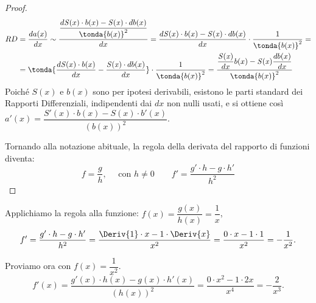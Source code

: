 \begin{proof}
\begin{align*}
 RD  &=\dfrac{da(x)}{dx}\sim  \dfrac{\dfrac{d\mathit{S}(x) \cdot b(x) - 
\mathit{S(x)} \cdot db(x)}{\tonda{b(x)}^2}}{dx}=
\dfrac{d\mathit{S}(x) \cdot b(x) - \mathit{S(x)} \cdot 
 db(x)}{dx}\cdot\dfrac{1}{\tonda{b(x)}^2}=\\
&=\tonda{\dfrac{d\mathit{S}(x) \cdot b(x)}{dx}-
  \frac{\mathit{S(x)} \cdot  db(x)}{dx} }\cdot\dfrac{1}{\tonda{b(x)}^2}= 
\dfrac{\dfrac{\mathit{S(x)}}{dx}b(x)-
\mathit{S(x)}\dfrac{db(x)}{dx}}{\tonda{b(x)}^2}
\end{align*}
Poiché \(\mathit{S(x)}\) e \(b(x)\) sono per ipotesi derivabili, esistono le 
parti standard dei Rapporti Differenziali, indipendenti dai \(dx\) non nulli 
usati, e si ottiene così 
\(a'(x)=\dfrac{\mathit{S'(x)}\cdot b(x)-
      \mathit{S(x)} \cdot b'(x)}{(b(x))^2}\).

Tornando alla notazione abituale, la regola della derivata del rapporto di 
funzioni diventa:
\[f = \dfrac{g}{h},\quad\text{ con } h \ne 0 \qquad
 f' = \dfrac{g' \cdot h - g \cdot h'}{h^2}\]
\end{proof}
\begin{esempio}
 Applichiamo la regola alla funzione: 
\(f(x) = \dfrac{g(x)}{h(x)} = \dfrac{1}{x}\), 
\[
f'= \dfrac{g'\cdot h - g \cdot h'}{h^2} =
    \dfrac{\Deriv{1} \cdot x - 1 \cdot \Deriv{x}}{x^2} =
    \dfrac{0 \cdot x - 1 \cdot 1}{x^2} = -\dfrac{1}{x^2}.
\]
\end{esempio}

\begin{esempio}
Proviamo ora con \(f(x)= \dfrac{1}{x^2}\). 
\[
f'(x)= \dfrac{g'(x)\cdot h(x)-g(x)\cdot h'(x)}{(h(x))^2}=
\dfrac{0\cdot x^2-1\cdot 2x}{x^4}=-\dfrac{2}{x^3}.
\]
\end{esempio}

